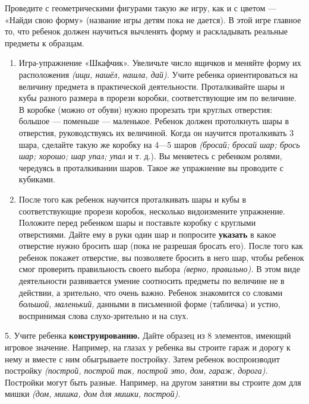 \documentclass[a5paper]{book}
\renewcommand{\emph}[1]{\textit{#1}}
\begin{document}
Проведите с геометрическими фигурами такую же игру, как и с цветом ---
«Найди свою форму» (название игры детям пока не дается). В этой игре
главное то, что ребенок должен научиться вычленять форму и раскладывать
реальные предметы к образцам.


\begin{enumerate}
\def\labelenumi{\arabic{enumi}.}
\setcounter{enumi}{2}
\item
  
  Игра-упражнение «Шкафчик». Увеличьте число ящичков и меняйте форму их
  расположения \emph{(ищи, нашёл, нашла, дай).} Учите ребенка
  ориентироваться на величину предмета в практической деятельности.
  Проталкивайте шары и кубы разного размера в прорези коробки,
  соответствующие им по величине. В коробке (можно от обуви) нужно
  прорезать три круглых отверстия: большое --- поменьше --- маленькое.
  Ребенок должен протолкнуть шары в отверстия, руководствуясь их
  величиной. Когда он научится проталкивать 3 шара, сделайте такую же
  коробку на 4---5 шаров \emph{(бросай; бросай шар; брось шар; хорошо;
  шар упал; упал} и т. д.). Вы меняетесь с ребенком ролями, чередуясь в
  проталкивании шаров. Такое же упражнение вы проводите с кубиками.
  
\item
  
  После того как ребенок научится проталкивать шары и кубы в
  соответствующие прорези коробок, несколько видоизмените упражнение.
  Положите перед ребенком шары и поставьте коробку с круглыми
  отверстиями. Дайте ему в руки один шар и попросите \textbf{указать} в
  какое отверстие нужно бросить шар (пока не разрешая бросать его).
  После того как ребенок покажет отверстие, вы позволяете бросить в него
  шар, чтобы ребенок смог проверить правильность своего выбора
  \emph{(верно, правильно).} В этом виде деятельности развивается умение
  соотносить предметы по величине не в действии, а зрительно, что очень
  важно. Ребенок знакомится со словами \emph{большой, маленький,}
  данными в письменной форме (табличка) и устно, воспринимая слова
  слухо-зрительно и на слух.
  
\end{enumerate}


5. Учите ребенка \textbf{конструированию.} Дайте образец из 8 элементов,
имеющий игровое значение. Например, на глазах у ребенка вы строите гараж
и дорогу к нему и вместе с ним обыгрываете постройку. Затем ребенок
воспроизводит постройку \emph{(построй, построй так, построй это, дом,
гараж, дорога).} Постройки могут быть разные. Например, на другом
занятии вы строите дом для мишки \emph{(дом, мишка, дом для мишки,
построй).}
\end{document}
